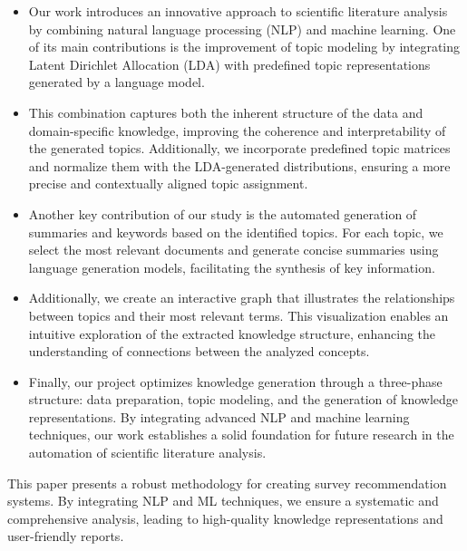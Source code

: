\documentclass[runningheads]{llncs}
\begin{document}
\begin{itemize}
	\item Our work introduces an innovative approach to scientific literature analysis by combining natural language processing (NLP) and machine learning. One of its main contributions is the improvement of topic modeling by integrating Latent Dirichlet Allocation (LDA) with predefined topic representations generated by a language model.
	
	\item This combination captures both the inherent structure of the data and domain-specific knowledge, improving the coherence and interpretability of the generated topics. Additionally, we incorporate predefined topic matrices and normalize them with the LDA-generated distributions, ensuring a more precise and contextually aligned topic assignment.
	
	\item Another key contribution of our study is the automated generation of summaries and keywords based on the identified topics. For each topic, we select the most relevant documents and generate concise summaries using language generation models, facilitating the synthesis of key information.
	
	\item Additionally, we create an interactive graph that illustrates the relationships between topics and their most relevant terms. This visualization enables an intuitive exploration of the extracted knowledge structure, enhancing the understanding of connections between the analyzed concepts.
	
	\item Finally, our project optimizes knowledge generation through a three-phase structure: data preparation, topic modeling, and the generation of knowledge representations. By integrating advanced NLP and machine learning techniques, our work establishes a solid foundation for future research in the automation of scientific literature analysis.
\end{itemize}


This paper presents a robust methodology for creating survey recommendation systems. By integrating NLP and ML techniques, we ensure a systematic and comprehensive analysis, leading to high-quality knowledge representations and user-friendly reports.
\end{document}
